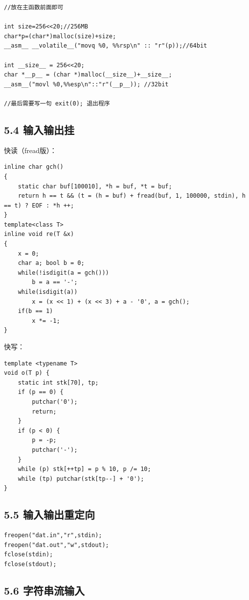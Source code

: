 \documentclass[11pt]{article}		%
\begin{document}
\begin{verbatim}
//放在主函数前面即可

int size=256<<20;//256MB
char*p=(char*)malloc(size)+size;
__asm__ __volatile__("movq %0, %%rsp\n" :: "r"(p));//64bit

int __size__ = 256<<20;
char *__p__ = (char *)malloc(__size__)+__size__;
__asm__("movl %0,%%esp\n"::"r"(__p__)); //32bit

//最后需要写一句 exit(0); 退出程序
\end{verbatim}

\subsection{5.4 输入输出挂}\label{ux8f93ux5165ux8f93ux51faux6302}

快读（fread版）：

\begin{verbatim}
inline char gch()
{
    static char buf[100010], *h = buf, *t = buf;
    return h == t && (t = (h = buf) + fread(buf, 1, 100000, stdin), h == t) ? EOF : *h ++;
}
template<class T>
inline void re(T &x)
{
    x = 0;
    char a; bool b = 0;
    while(!isdigit(a = gch()))
        b = a == '-';
    while(isdigit(a))
        x = (x << 1) + (x << 3) + a - '0', a = gch();
    if(b == 1)
        x *= -1;
}
\end{verbatim}

快写：

\begin{verbatim}
template <typename T>
void o(T p) {
    static int stk[70], tp;
    if (p == 0) {
        putchar('0');
        return;
    }
    if (p < 0) {
        p = -p;
        putchar('-');
    }
    while (p) stk[++tp] = p % 10, p /= 10;
    while (tp) putchar(stk[tp--] + '0');
}
\end{verbatim}

\subsection{5.5
输入输出重定向}\label{ux8f93ux5165ux8f93ux51faux91cdux5b9aux5411}

\begin{verbatim}
freopen("dat.in","r",stdin);
freopen("dat.out","w",stdout);
fclose(stdin);
fclose(stdout);
\end{verbatim}

\subsection{5.6
字符串流输入}\label{ux5b57ux7b26ux4e32ux6d41ux8f93ux5165}
\end{document}
